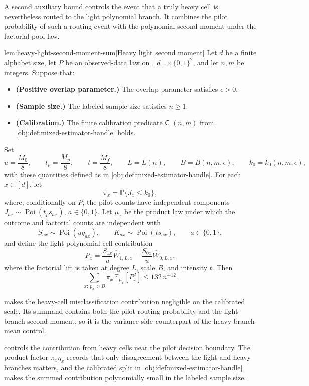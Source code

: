 A second auxiliary bound controls the event that a truly heavy cell is nevertheless routed to the light polynomial branch. It combines the pilot probability of such a routing event with the polynomial second moment under the factorial-pool law.

\begin{lemmav}{lem:heavy-light-second-moment-sum}[Heavy light second moment]
Let \(d\) be a finite alphabet size, let \(P\) be an observed-data law on \([d]\times\{0,1\}^2\), and let \(n,m\) be integers. Suppose that:
\begin{itemize}
\item \textbf{(Positive overlap parameter.)} The overlap parameter satisfies \(\epsilon>0\).
\item \textbf{(Sample size.)} The labeled sample size satisfies \(n\ge1\).
\item \textbf{(Calibration.)} The finite calibration predicate \(\mathsf C_\epsilon(n,m)\) from \cref{obj:def:mixed-estimator-handle} holds.
\end{itemize}
Set
\[
u=\frac{M_0}{8},\qquad
t_p=\frac{M_p}{8},\qquad
t=\frac{M_f}{8},\qquad
L=L(n),\qquad
B=B(n,m,\epsilon),\qquad
k_0=k_0(n,m,\epsilon),
\]
with these quantities defined as in \cref{obj:def:mixed-estimator-handle}. For each \(x\in[d]\), let
\[
\pi_x
=
\mathbb P\{J_x\le k_0\},
\]
where, conditionally on \(P\), the pilot counts have independent components
\(J_{ax}\sim\operatorname{Poi}(t_p s_{ax})\), \(a\in\{0,1\}\). Let \(\mu_x\) be the product law under which the outcome and factorial counts are independent with
\[
S_{ax}\sim\operatorname{Poi}(u q_{ax}),
\qquad
K_{ax}\sim\operatorname{Poi}(t s_{ax}),
\qquad a\in\{0,1\},
\]
and define the light polynomial cell contribution
\[
P_x
=
\frac{S_{1x}}{u}\widehat W_{1,L,x}
-
\frac{S_{0x}}{u}\widehat W_{0,L,x},
\]
where the factorial lift is taken at degree \(L\), scale \(B\), and intensity \(t\). Then
\[
\sum_{x:\,p_x>B}\pi_x\,\mathbb E_{\mu_x}\!\left[P_x^2\right]
\le
132\,n^{-12}.
\]
\end{lemmav}

 makes the heavy-cell misclassification contribution negligible on the calibrated scale. Its summand contains both the pilot routing probability and the light-branch second moment, so it is the variance-side counterpart of the heavy-branch mean control.

 controls the contribution from heavy cells near the pilot decision boundary. The product factor \(\pi_x\eta_x\) records that only disagreement between the light and heavy branches matters, and the calibrated split in \cref{obj:def:mixed-estimator-handle} makes the summed contribution polynomially small in the labeled sample size.

